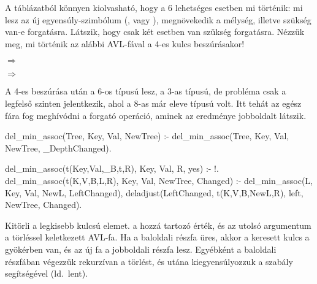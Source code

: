 A  táblázatból könnyen kiolvasható, hogy a
6 lehetséges esetben mi történik: mi lesz az új
egyensúly-szimbólum (\pr{<}, \pr{-} vagy \pr{>}),
megnövekedik a mélység, illetve szükség van-e
forgatásra. Látszik, hogy csak két esetben van
szükség forgatásra. Nézzük meg, mi történik az
alábbi AVL-fával a 4-es kulcs beszúrásakor!

\begin{center}
\begin{minipage}[b][3.3cm][t]{.2\textwidth}
\end{minipage}
\parbox[b][3.3cm][c]{3em}{\center$\Longrightarrow$}
\begin{minipage}[b][3.3cm][t]{.2\textwidth}
\end{minipage}
\parbox[b][3.3cm][c]{3em}{\center$\Longrightarrow$}
\begin{minipage}[b][3.3cm][t]{.3\textwidth}
\end{minipage}
\end{center}
A 4-es beszúrása után a 6-os \pr{<} típusú lesz, a
3-as \pr{>} típusú, de probléma csak a legfelső
szinten jelentkezik, ahol a 8-as már eleve \pr{<}
típusú volt. Itt tehát az egész fára fog meghívódni
a forgató  operáció, aminek az
eredménye jobboldalt látszik.

\begin{program*}
del_min_assoc(Tree, Key, Val, NewTree) :-
    del_min_assoc(Tree, Key, Val,
                  NewTree, _DepthChanged).

del_min_assoc(t(Key,Val,_B,t,R), Key, Val,
              R, yes) :- !.
del_min_assoc(t(K,V,B,L,R), Key, Val,
              NewTree, Changed) :-
    del_min_assoc(L, Key, Val, NewL, LeftChanged),
    deladjust(LeftChanged, t(K,V,B,NewL,R),
              left, NewTree, Changed).
\end{program*}
Kitörli a legkisebb kulcsú elemet.  a hozzá
tartozó érték, és az utolsó argumentum a törléssel
keletkezett AVL-fa. Ha a baloldali részfa üres,
akkor a keresett kulcs a gyökérben van, és az új fa
a jobboldali részfa lesz. Egyébként a baloldali
részfában végezzük rekurzívan a törlést, és utána
kiegyensúlyozzuk a  szabály
segítségével (ld.~lent).


